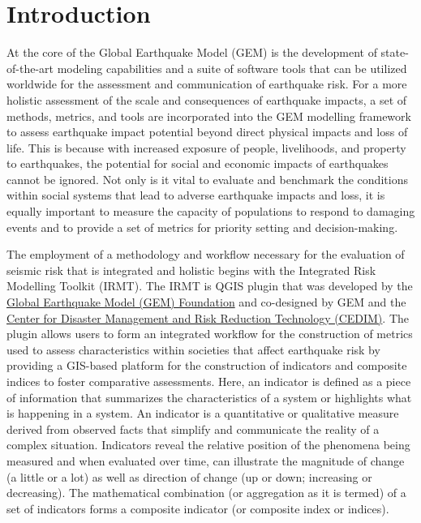 \section{Introduction}
At the core of the Global Earthquake Model (GEM) is the development of
state-of-the-art modeling capabilities and a suite of software tools that can
be utilized worldwide for the assessment and communication of earthquake risk.
For a more holistic assessment of the scale and consequences of earthquake
impacts, a set of methods, metrics, and tools are incorporated into the GEM
modelling framework to assess earthquake impact potential beyond direct
physical impacts and loss of life. This is because with increased exposure of
people, livelihoods, and property to earthquakes, the potential for social and
economic impacts of earthquakes cannot be ignored. Not only is it vital to
evaluate and benchmark the conditions within social systems that lead to
adverse earthquake impacts and loss, it is equally important to measure the
capacity of populations to respond to damaging events and to provide a set of
metrics for priority setting and decision-making.

The employment  of a methodology and workflow necessary for the evaluation of
seismic risk that is integrated and holistic begins with the Integrated Risk
Modelling Toolkit (IRMT). The IRMT is QGIS plugin that was developed by the
\href{www.globalquakemodel.org}{Global Earthquake Model (GEM) Foundation} and
co-designed by GEM and the \href{www.cedim.de/english/index.php}{Center for
Disaster Management and Risk Reduction Technology (CEDIM)}. The plugin allows
users to form an integrated workflow for the construction of metrics used to
assess characteristics within societies that affect earthquake risk by
providing a GIS-based platform for the construction of indicators and composite
indices to foster comparative assessments. Here, an indicator is defined as a
piece of information that summarizes the characteristics of a system or
highlights what is happening in a system. An indicator is a quantitative or
qualitative measure derived from observed facts that simplify and communicate
the reality of a complex situation. Indicators reveal the relative position of
the phenomena being measured and when evaluated over time, can illustrate the
magnitude of change (a little or a lot) as well as direction of change (up or
down; increasing or decreasing). The mathematical combination (or aggregation
as it is termed) of a set of indicators forms a composite indicator (or
composite index or indices).

